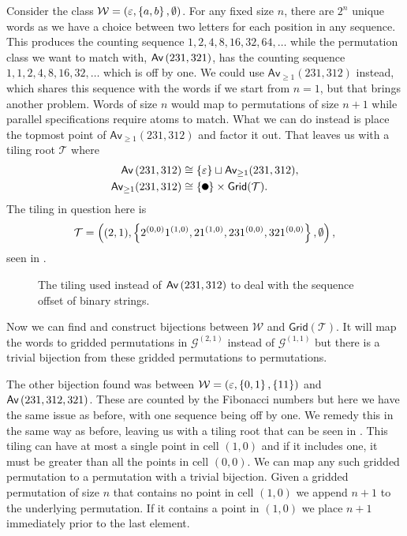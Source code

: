 Consider the class $\mathcal{W} = (\varepsilon, \left\{a,b\right\}, \emptyset)$. For any fixed size $n$, there are $2^n$ unique words as we have a choice between two letters for each position in any sequence. This produces the counting sequence $1, 2, 4, 8, 16, 32, 64, \dotsc$ while the permutation class we want to match with, $\textsf{Av}\left(231,321\right)$, has the counting sequence $1, 1, 2, 4, 8, 16, 32, \dotsc$ which is off by one. We could use $\textsf{Av}_{\geq1}(231,312)$ instead, which shares this sequence with the words if we start from $n=1$, but that brings another problem. Words of size $n$ would map to permutations of size $n+1$ while parallel specifications require atoms to match. What we can do instead is place the topmost point of $\textsf{Av}_{\geq1}(231,312)$ and factor it out. That leaves us with a tiling root $\mathcal{T}$ where
\begin{align*}
    \Av{231,312} &\cong \set{\varepsilon} \sqcup \textsf{Av}_{\geq1}(231,312),\\
    \textsf{Av}_{\geq1}(231,312) &\cong \set{\point{0.1}}\times \textsf{Grid}(\mathcal{T}).
\end{align*}
The tiling in question here is
\[
    \mathcal{T} = \left((2,1), \left\{2^{(0,0)}1^{(1,0)}, 21^{(1,0)}, 231^{(0,0)}, 321^{(0,0)}\right\},\emptyset\right),
\]
seen in .
\begin{figure}[ht!]
    \centering
    
    \caption{The tiling used instead of $\textsf{Av}\left(231,312\right)$ to deal with the sequence offset of binary strings.}
    \label{fig:wordtiling}
\end{figure}
Now we can find and construct bijections between $\mathcal{W}$ and $\textsf{Grid}(\mathcal{T})$. It will map the words to gridded permutations in $\mathcal{G}^{(2,1)}$ instead of $\mathcal{G}^{(1,1)}$ but there is a trivial bijection from these gridded permutations to permutations.

The other bijection found was between $\mathcal{W} = (\varepsilon, \left\{0,1\right\}, \left\{11\right\})$ and $\textsf{Av}\left(231,312,321\right)$. These are counted by the Fibonacci numbers but here we have the same issue as before, with one sequence being off by one. We remedy this in the same way as before, leaving us with a tiling root that can be seen in . This tiling can have at most a single point in cell $(1,0)$ and if it includes one, it must be greater than all the points in cell $(0,0)$. We can map any such gridded permutation to a permutation with a trivial bijection. Given a gridded permutation of size $n$ that contains no point in cell $(1,0)$ we append $n+1$ to the underlying permutation. If it contains a point in $(1,0)$ we place $n+1$ immediately prior to the last element.

